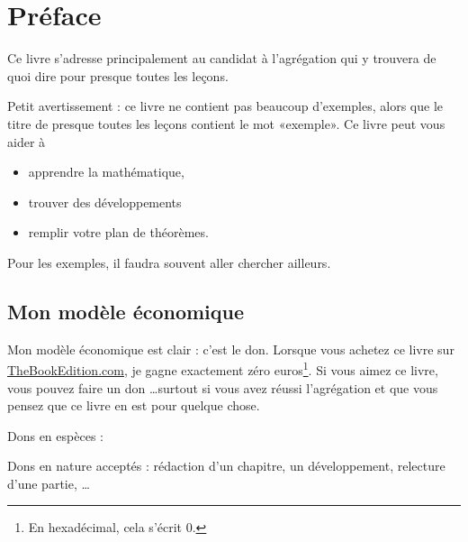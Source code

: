 
\section{Préface}

Ce livre s'adresse principalement au candidat à l'agrégation qui y trouvera de quoi dire pour presque toutes les leçons.

Petit avertissement : ce livre ne contient pas beaucoup d'exemples, alors que le titre de presque toutes les leçons contient le mot «exemple». Ce livre peut vous aider à
\begin{itemize}
    \item apprendre la mathématique,
    \item trouver des développements
    \item remplir votre plan de théorèmes.
\end{itemize}
Pour les exemples, il faudra souvent aller chercher ailleurs.

\subsection{Mon modèle économique}

Mon modèle économique est clair : c'est le don. Lorsque vous achetez ce livre sur \href{http://www.thebookedition.com/fr/}{TheBookEdition.com}, je gagne exactement zéro euros\footnote{En hexadécimal, cela s'écrit \( 0\).}. Si vous aimez ce livre, vous pouvez faire un don \ldots surtout si vous avez réussi l'agrégation et que vous pensez que ce livre en est pour quelque chose.

Dons en espèces :


Dons en nature acceptés : rédaction d'un chapitre, un développement, relecture d'une partie, \ldots

